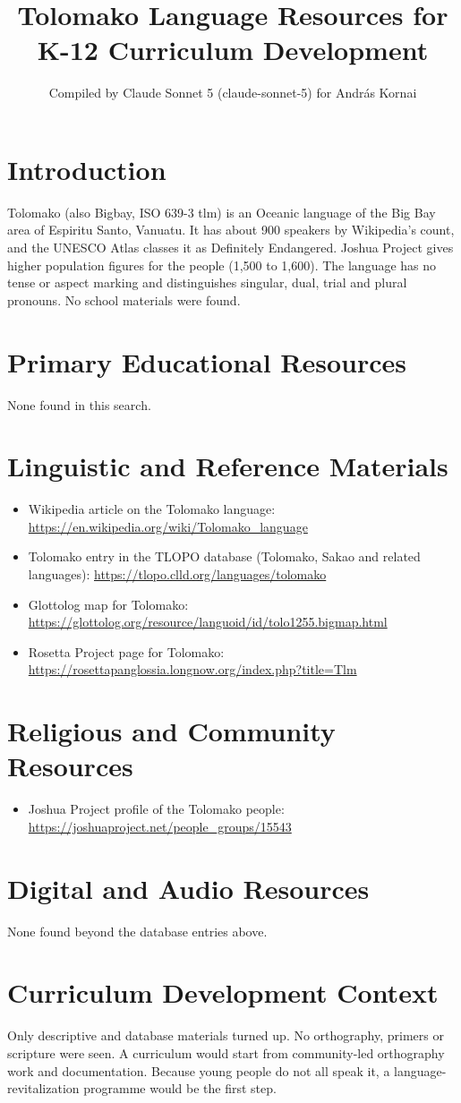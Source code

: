 \documentclass[12pt]{article}
\title{Tolomako Language Resources for K-12 Curriculum Development}
\author{Compiled by Claude Sonnet 5 (claude-sonnet-5) for Andr\'as Kornai}
\date{}
\begin{document}
\maketitle

\section{Introduction}
Tolomako (also Bigbay, ISO 639-3 tlm) is an Oceanic language of the Big Bay area of Espiritu Santo, Vanuatu. It has about 900 speakers by Wikipedia's count, and the UNESCO Atlas classes it as Definitely Endangered. Joshua Project gives higher population figures for the people (1,500 to 1,600). The language has no tense or aspect marking and distinguishes singular, dual, trial and plural pronouns. No school materials were found.

\section{Primary Educational Resources}
None found in this search.

\section{Linguistic and Reference Materials}
\begin{itemize}
\item Wikipedia article on the Tolomako language: \url{https://en.wikipedia.org/wiki/Tolomako_language}
\item Tolomako entry in the TLOPO database (Tolomako, Sakao and related languages): \url{https://tlopo.clld.org/languages/tolomako}
\item Glottolog map for Tolomako: \url{https://glottolog.org/resource/languoid/id/tolo1255.bigmap.html}
\item Rosetta Project page for Tolomako: \url{https://rosettapanglossia.longnow.org/index.php?title=Tlm}
\end{itemize}

\section{Religious and Community Resources}
\begin{itemize}
\item Joshua Project profile of the Tolomako people: \url{https://joshuaproject.net/people_groups/15543}
\end{itemize}

\section{Digital and Audio Resources}
None found beyond the database entries above.

\section{Curriculum Development Context}
Only descriptive and database materials turned up. No orthography, primers or scripture were seen. A curriculum would start from community-led orthography work and documentation. Because young people do not all speak it, a language-revitalization programme would be the first step.
\end{document}

